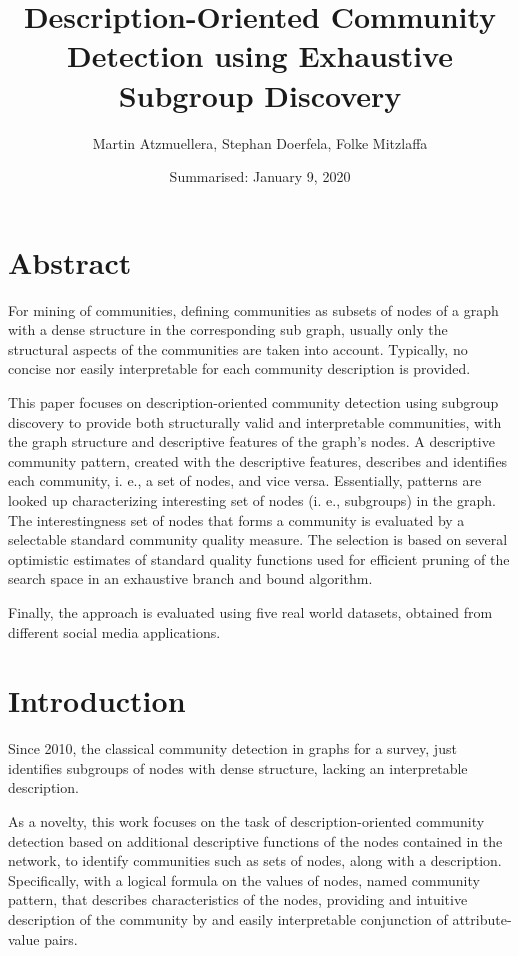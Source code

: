 \documentclass[a4paper]{article}
\title{Description-Oriented Community Detection using Exhaustive Subgroup Discovery}
\date{Summarised: January 9, 2020}
\author{Martin Atzmuellera, Stephan Doerfela, Folke Mitzlaffa}
\begin{document}
\maketitle
\section{Abstract}
For mining of communities, defining communities as subsets of nodes of a graph with a dense structure in the corresponding sub graph, usually only the structural aspects of the communities are taken into account. Typically, no concise nor easily interpretable for each community description is provided. 
\vskip 0.3cm

This paper focuses on description-oriented community detection using subgroup discovery to provide both structurally valid and interpretable communities, with the graph structure and descriptive features of the graph’s nodes. A descriptive community pattern, created with the descriptive features, describes and identifies each community, i. e., a set of nodes, and vice versa. Essentially, patterns are looked up characterizing interesting set of nodes (i. e., subgroups) in the graph. The interestingness set of nodes that forms a community is evaluated by a selectable standard community quality measure. The selection is based on several optimistic estimates of standard quality functions used for efficient pruning of the search space in an exhaustive branch and bound algorithm. 
\vskip 0.3cm

Finally, the approach is evaluated using five real world datasets, obtained from different social media applications.

\section{Introduction}
Since 2010, the classical community detection in graphs for a survey, just identifies subgroups of nodes with dense structure, lacking an interpretable description.
\vskip 0.3cm

As a novelty, this work focuses on the task of description-oriented community detection based on additional descriptive functions of the nodes contained in the network, to identify communities such as sets of nodes, along with a description. Specifically, with a logical formula on the values of nodes, named community pattern, that describes characteristics of the nodes, providing and intuitive description of the community by and easily interpretable conjunction of attribute-value pairs.
\vskip 0.3cm
\end{document}
